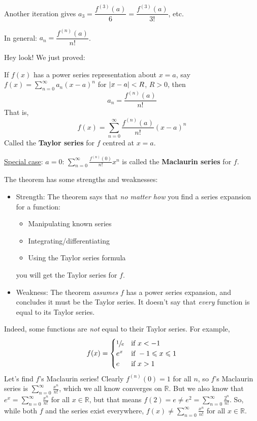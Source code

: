 Another iteration gives $ a_3=\dfrac{f^{(3)}(a)}{6}=\dfrac{f^{(3)}(a)}{3!}  $, etc.

In general: $ a_n=\dfrac{f^{(n)}(a)}{n!} $.

Hey look! We just proved:

\begin{Theorem}{}{}
    If $ f(x) $ has a power series representation about $ x=a $, say $ f(x)=\sum\limits_{n=0}^{\infty}
        a_n(x-a)^n $ for $ \lvert x-a\rvert<R $, $ R>0 $, then
    \[ a_n=\frac{f^{(n)}(a)}{n!} \]
    That is,
    \[ f(x)=\sum\limits_{n=0}^{\infty} \frac{f^{(n)}(a)}{n!}(x-a)^n  \]
    Called the \textbf{Taylor series} for $ f $ centred at $ x=a $.
\end{Theorem}

\underline{Special case}: $ a=0 $: $ \displaystyle \sum\limits_{n=0}^{\infty}
    \frac{f^{(n)}(0)}{n!} x^n $ is called the \textbf{Maclaurin series} for $ f $.

\begin{Remark}{}{}
    The theorem has some strengths and weaknesses:
    \begin{itemize}
        \item Strength: The theorem says that \emph{no matter how} you find a series
              expansion for a function:
              \begin{itemize}
                  \item Manipulating known series
                  \item Integrating/differentiating
                  \item Using the Taylor series formula
              \end{itemize}
              you will get the Taylor series for $ f $.
        \item Weakness: The theorem \emph{assumes} $ f $ has a power
              series expansion, and concludes it must be the Taylor series.
              It doesn't say that \emph{every} function is equal
              to its Taylor series.
    \end{itemize}
\end{Remark}
Indeed, some functions are \emph{not} equal
to their Taylor series. For example,
\[ f(x)=
    \begin{cases}
        \sfrac{1}{e} & \text{if }x<-1                     \\
        e^x          & \text{if }-1\leqslant x\leqslant 1 \\
        e            & \text{if }x>1
    \end{cases} \]
Let's find $ f $'s Maclaurin series! Clearly
$ f^{(n)}(0)=1 $ for all $ n $, so $ f $'s Maclaurin series is
$ \displaystyle \sum\limits_{n=0}^{\infty} \frac{x^n}{n!} $,
which we all know converges on $ \mathbb{R} $. But we also know
that $ \displaystyle
    e^x=\sum\limits_{n=0}^{\infty} \frac{x^n}{n!} $ for all $ x\in\mathbb{R} $,
but that means $ \displaystyle f(2)=e\neq e^2=\sum\limits_{n=0}^{\infty} \frac{2^n}{n!} $.
So, while both $ f $ and the series exist everywhere,
$ \displaystyle f(x)\neq \sum\limits_{n=0}^{\infty} \frac{x^n}{n!}  $ for all $ x\in\mathbb{R} $.

